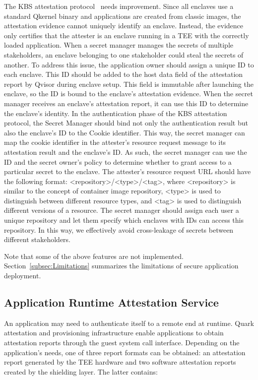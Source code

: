The KBS attestation protocol~\cite*{kbs_Attestation_protocol} needs improvement. Since all enclaves use a standard Qkernel binary and applications are created from classic images, the attestation evidence cannot uniquely identify an enclave. Instead, the evidence only certifies that the attester is an enclave running in a TEE with the correctly loaded application. 
When a secret manager manages the secrets of multiple stakeholders, an enclave belonging to one stakeholder could steal the secrets of another. To address this issue, the application owner should assign a unique ID to each enclave. This ID should be added to the host data field of the attestation report by Qvisor during enclave setup. This field is immutable after 
launching the enclave, so the ID is bound to the enclave's attestation evidence. When the secret manager receives an enclave's attestation report, it can use this ID to determine the enclave's identity. In the authentication phase of the KBS attestation protocol, the Secret Manager should bind not only the authentication result but also the enclave's ID to the Cookie identifier. 
This way, the secret manager can map the cookie identifier in the attester's resource request message to its attestation result and the enclave's ID. As such, the secret manager can use the ID and the secret owner's policy to determine whether to grant access to a particular secret to the enclave. The attester's resource request URL should have the following 
format: <repository>/<type>/<tag>, where <repository> is similar to the concept of container image repository, <type> is used to distinguish between different resource types, and <tag> is used to distinguish different versions of a resource. The secret manager should assign each user a unique repository and let them specify which enclaves with IDs can access 
this repository. In this way, we effectively avoid cross-leakage of secrets between different stakeholders.

Note that some of the above features are not implemented. Section~\ref{subsec:Limitations} summarizes the limitations of secure application deployment.

\subsection{Application Runtime Attestation Service}
\label{sec:runtime_attesation}

An application may need to authenticate itself to a remote end at runtime. Quark attestation and provisioning infrastructure enable applications to obtain attestation reports through the guest system call interface. Depending on the application's needs, one of three report formats can be 
obtained: an attestation report generated by the TEE hardware and two software attestation reports created by the shielding layer. The latter contains:


